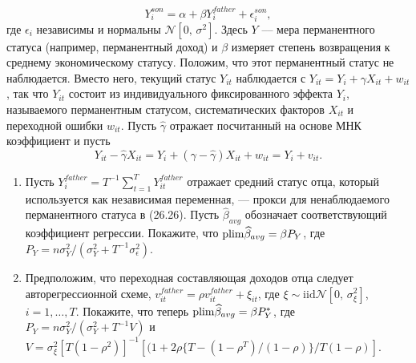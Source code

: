 \begin{enumerate}
\begin{equation}
Y^{son}_i=\alpha + \beta Y^{father}_i + \epsilon^{son}_i,
\end{equation}
где $\epsilon_i$ независимы и нормальны $\mathcal{N}[0,\, \sigma^2]$. Здесь $Y$ --– мера перманентного статуса (например, перманентный доход) и $\beta$ измеряет степень возвращения к среднему экономическому статусу. Положим, что этот перманентный статус не наблюдается. Вместо него, текущий статус $Y_{it}$ наблюдается с $Y_{it}=Y_i+ \gamma X_{it}+ w_{it}$, так что $Y_{it}$  состоит из индивидуального фиксированного эффекта $Y_{i}$, называемого  перманентным статусом, систематических факторов $X_{it}$ и переходной ошибки $w_{it}$. Пусть $\widehat{\gamma}$ отражает посчитанный на основе МНК коэффициент и пусть
\[
Y_{it}-\widehat{\gamma}X_{it}= Y_i+ (\gamma - \widehat{\gamma})X_{it} + w_{it} = Y_i + v_{it}.
\]
\begin{enumerate}
\item Пусть $Y^{father}_i=T^{-1} \sum \limits^{T}_{t=1}Y^{father}_{it}$ отражает средний статус отца, который используется как независимая переменная, --- прокси для ненаблюдаемого перманентного статуса в (26.26). Пусть $\widehat{\beta}_{avg}$ обозначает соответствующий коэффициент регрессии. Покажите, что $\mathrm{plim } \widehat{\beta}_{avg}=\beta P_Y$, где $P_Y=n\sigma^2_Y/(\sigma^2_Y+T^{-1} \sigma^2_{\epsilon})$.
\item Предположим, что переходная составляющая доходов отца следует авторегрессионной схеме, $v^{father}_{it}=\rho v^{father}_{it}+\xi_{it}$, где $\xi \sim \text{iid} \mathcal{N}[0,\, \sigma^2_{\xi}]$, $i=1,\dots ,T$. Покажите, что теперь $\mathrm{plim } \widehat{\beta}_{avg}=\beta P^*_Y$, где $P_Y=n\sigma^2_Y/(\sigma^2_Y+T^{-1} V)$ и $V=\sigma^2_{\xi}[T(1-\rho^2)]^{-1}[(1+2\rho\{ T-(1-\rho^T)/(1-\rho) \} /T(1-\rho)]$.
\end{enumerate}
\end{enumerate} 

